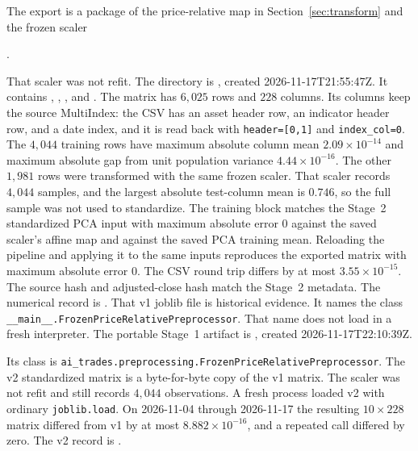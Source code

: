 \documentclass[11pt]{article}
\begin{document}
The export is a package of the price-relative map in Section~\ref{sec:transform} and the frozen scaler
\begin{center}
.
\end{center}
That scaler was not refit.
The directory is , created 2026-11-17T21:55:47Z.
It contains , , , and .
The matrix has \(6{,}025\) rows and \(228\) columns.
Its columns keep the source MultiIndex: the CSV has an asset header row, an indicator header row, and a date index, and it is read back with \texttt{header=[0,1]} and \texttt{index\_col=0}.
The \(4{,}044\) training rows have maximum absolute column mean \(2.09\times 10^{-14}\) and maximum absolute gap from unit population variance \(4.44\times 10^{-16}\).
The other \(1{,}981\) rows were transformed with the same frozen scaler.
That scaler records \(4{,}044\) samples, and the largest absolute test-column mean is \(0.746\), so the full sample was not used to standardize.
The training block matches the Stage~2 standardized PCA input with maximum absolute error \(0\) against the saved scaler's affine map and against the saved PCA training mean.
Reloading the pipeline and applying it to the same inputs reproduces the exported matrix with maximum absolute error \(0\).
The CSV round trip differs by at most \(3.55\times 10^{-15}\).
The source hash and adjusted-close hash match the Stage~2 metadata.
The numerical record is .
That v1 joblib file is historical evidence.
It names the class \texttt{\_\_main\_\_.FrozenPriceRelativePreprocessor}.
That name does not load in a fresh interpreter.
The portable Stage~1 artifact is
,
created 2026-11-17T22:10:39Z.

Its class is \texttt{ai\_trades.preprocessing.FrozenPriceRelativePreprocessor}.
The v2 standardized matrix is a byte-for-byte copy of the v1 matrix.
The scaler was not refit and still records \(4{,}044\) observations.
A fresh process loaded v2 with ordinary \texttt{joblib.load}.
On 2026-11-04 through 2026-11-17 the resulting \(10\times 228\) matrix differed from v1 by at most \(8.882\times 10^{-16}\), and a repeated call differed by zero.
The v2 record is .
\end{document}
